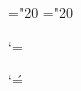
\def\@mbi{mtmib}		%
\def\@mbsy{mtsyb}		%
\def\@mcsc{tirsc}		%
 



\mathchardef\Section="20\S@HX
\mathchardef\Paragraph="20\P@HX

\def\@fnsymbol#1{\ifcase#1\or *\or \dagger\or \ddagger\or
  \Section\or \Paragraph\or \|\or **\or \dagger\dagger
   \or \ddagger\ddagger \else\@ctrerr\fi\relax}
 





\def\MTEXMOD#1#2#3{%
 \dimen@#1\relax\PSZ@
 \FONT@{mtex}\nextiii@\textfont\thr@@\next@
 \setbox\z@\hbox{\next@ B}\p@renwd\wd\z@
 \ifx\amstexloaded@\relax
  \buffer@\fontdimen13 \next@
  \buffer\buffer@
 \fi
 \FONT@{mtex}\nextiii@\scriptfont\thr@@\next@
 \FONT@{mtex}\nextiii@\scriptscriptfont\thr@@\next@\relax}





\catcode`\@=\atcode		%

\catcode`\'=\rqcode		%

